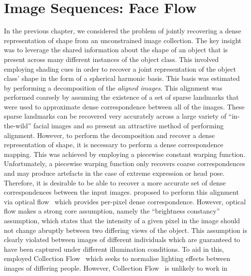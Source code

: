 \chapter{Image Sequences: Face Flow}\label{ch:face_flow}
\minitoc{}
In the previous chapter, we considered the problem of jointly recovering a
dense representation of shape from an unconstrained image collection. The key
insight was to leverage the shared information about the shape of an object
that is present across many different instances of the object class. This
involved employing shading cues in order to recover a joint representation
of the object class' shape in the form of a spherical harmonic basis. This
basis was estimated by performing a decomposition of the
\textit{aligned images}. This alignment was performed coarsely by assuming the
existence of a set of sparse landmarks that were used to approximate
dense correspondence between all of the images. These sparse landmarks can
be recovered very accurately across a large variety of ``in-the-wild'' facial
images and so present an attractive method of performing alignment. However,
to perform the decomposition and recover a dense representation of shape, it
is necessary to perform a dense correspondence mapping. This was achieved
by employing a piecewise constant warping function. Unfortunately, a
piecewise warping function only recovers coarse correspondences and may produce
artefacts in the case of extreme expression or head pose. Therefore, it is
desirable to be able to recover a more accurate set of dense correspondences 
between the input images. \citet{KemelmacherShlizerman:2013iv} proposed to
perform this alignment via optical flow~\cite{liu2009beyond} which provides
per-pixel dense correspondence. However, optical flow makes a
strong core assumption, namely the ``brightness constancy'' assumption, which states
that the intensity of a given pixel in the image should not change abruptly
between two differing views of the object. This assumption is clearly
violated between images of different individuals which are guaranteed to
have been captured under different illumination conditions. To aid in this,
\citet{KemelmacherShlizerman:2013iv} employed
Collection Flow~\cite{kemelmacher2012collection} which seeks to normalise
lighting effects between images of differing people. However, 
Collection Flow~\cite{kemelmacher2012collection} is unlikely to work in
